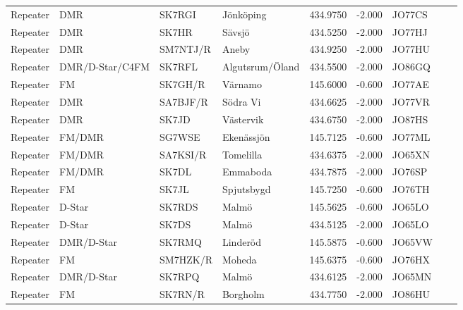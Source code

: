 \begin{longtable}{llllrrlcl}
	Repeater & DMR             & SK7RGI   & Jönköping               &   434.9750 &   -2.000 & JO77CS &  &  \\
	Repeater & DMR             & SK7HR    & Sävsjö                  &   434.5250 &   -2.000 & JO77HJ &  &  \\
	Repeater & DMR             & SM7NTJ/R & Aneby                   &   434.9250 &   -2.000 & JO77HU &  &  \\
	Repeater & DMR/D-Star/C4FM & SK7RFL   & Algutsrum/Öland         &   434.5500 &   -2.000 & JO86GQ &  &  \\
	Repeater & FM              & SK7GH/R  & Värnamo                 &   145.6000 &   -0.600 & JO77AE &  &  \\
	Repeater & DMR             & SA7BJF/R & Södra Vi                &   434.6625 &   -2.000 & JO77VR &  &  \\
	Repeater & DMR             & SK7JD    & Västervik               &   434.6750 &   -2.000 & JO87HS &  &  \\
	Repeater & FM/DMR          & SG7WSE   & Ekenässjön              &   145.7125 &   -0.600 & JO77ML &  &  \\
	Repeater & FM/DMR          & SA7KSI/R & Tomelilla               &   434.6375 &   -2.000 & JO65XN &  &  \\
	Repeater & FM/DMR          & SK7DL    & Emmaboda                &   434.7875 &   -2.000 & JO76SP &  &  \\
	Repeater & FM              & SK7JL    & Spjutsbygd              &   145.7250 &   -0.600 & JO76TH &  &  \\
	Repeater & D-Star          & SK7RDS   & Malmö                   &   145.5625 &   -0.600 & JO65LO &  &  \\
	Repeater & D-Star          & SK7DS    & Malmö                   &   434.5125 &   -2.000 & JO65LO &  &  \\
	Repeater & DMR/D-Star      & SK7RMQ   & Linderöd                &   145.5875 &   -0.600 & JO65VW &  &  \\
	Repeater & FM              & SM7HZK/R & Moheda                  &   145.6375 &   -0.600 & JO76HX &  &  \\
	Repeater & DMR/D-Star      & SK7RPQ   & Malmö                   &   434.6125 &   -2.000 & JO65MN &  &  \\
	Repeater & FM              & SK7RN/R  & Borgholm                &   434.7750 &   -2.000 & JO86HU &  &
\end{longtable}

\normalsize

